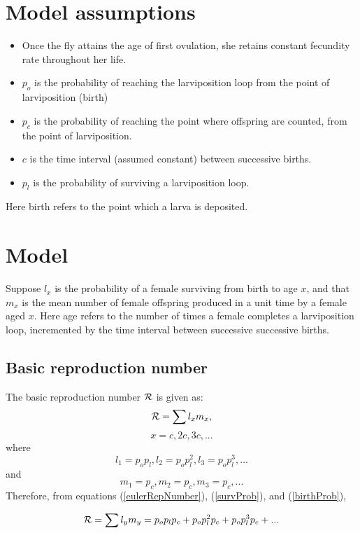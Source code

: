 \documentclass[12pt,a4paper]{article}
\begin{document}
\section*{Model assumptions} 
\begin{itemize} 
	\item  Once the fly attains the age of first ovulation, she retains constant fecundity rate throughout her life.   
	\item  $p_o$ is the probability of reaching the larviposition loop from the point of larviposition (birth)
	\item   $p_c$ is the probability of reaching the point where offspring are counted, from the point of larviposition.
	\item   $c$ is the time interval (assumed constant) between successive births. 
	\item   $p_l$ is the probability of surviving a larviposition loop.
\end{itemize}
 Here birth refers to the point which a larva is deposited. 

\section*{Model} 

Suppose  $l_{x}$ is the probability of a female surviving from birth to age $x$, and that $m_{x}$ is the mean number of female offspring produced in a unit time by a female aged $x$. Here age refers to the number of times a female completes a larviposition loop, incremented by the time interval between successive successive births. 

\subsection*{Basic reproduction number}

The basic reproduction number ${\cal R}$ is given as:
$${\cal R}=\sum l_{x}m_{x},$$
$$x=c,2c,3c,... $$
where
\begin{equation}
\label{survProb} 
l_{1}=p_op_l, l_{2}= p_op_l^2, l_{3}=p_op_l^3, . . .
\end{equation}
and
\begin{equation}
\label{birthProb} 
m_{1}=p_c, m_{2}=p_c, m_{3}=p_c, . . .
\end{equation}
Therefore, from equations (\ref{eulerRepNumber}),  (\ref{survProb}), and  (\ref{birthProb}),

$${\cal R}=\sum l_{y}m_{y} = p_op_lp_c + p_op_l^2 p_c + p_op_l^3p_c + ...$$
\end{document}
